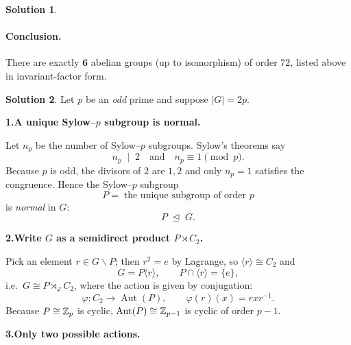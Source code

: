 \documentclass[12pt]{article}
\DeclareMathOperator{\Aut}{Aut}
\theoremstyle{definition} %
\newtheorem{solution}{Solution}
\theoremstyle{plain} %
\begin{document}
\begin{solution}
                \paragraph{Conclusion.}
                There are exactly \(\mathbf{6}\) abelian groups (up to isomorphism) of
                order \(72\), listed above in invariant-factor form.
                \end{solution}
                \begin{solution}
                  Let $p$ be an \emph{odd} prime and suppose $\lvert G\rvert = 2p$.
                  
                  \bigskip
                  \textbf{1.\;A unique Sylow–$p$ subgroup is normal.}
                  
                  Let $n_{p}$ be the number of Sylow–$p$ subgroups.  
                  Sylow’s theorems say
                  \[
                     n_{p}\;\mid\;2
                     \quad\text{and}\quad
                     n_{p}\equiv 1 \pmod{p}.
                  \]
                  Because $p$ is odd, the divisors of $2$ are $1,2$ and only
                  $n_{p}=1$ satisfies the congruence.  
                  Hence the Sylow–$p$ subgroup
                  \[
                     P=\;\text{the unique subgroup of order }p
                  \]
                  is \emph{normal} in $G$:
                  \[
                     P\;\trianglelefteq\;G.
                  \]
                  
                  \bigskip
                  \textbf{2.\;Write $G$ as a semidirect product $P\rtimes C_{2}$.}
                  
                  Pick an element $r\in G\smallsetminus P$; then $r^{2}=e$ by Lagrange,
                  so $\langle r\rangle\cong C_{2}$ and
                  \[
                     G = P\langle r\rangle,\qquad P\cap\langle r\rangle=\{e\},
                  \]
                  i.e.\ $G \cong P\rtimes_{\!\varphi} C_{2}$,
                  where the action is given by conjugation:
                  \[
                     \varphi:C_{2}\longrightarrow\Aut(P),
                     \qquad
                     \varphi(r)(x)=rxr^{-1}.
                  \]
                  Because $P\cong\Bbb Z_{p}$ is cyclic, 
                  $\Aut(P)\cong\Bbb Z_{p-1}$ is cyclic of order $p-1$.
                  
                  \bigskip
                  \textbf{3.\;Only two possible actions.}
                  

\end{solution}
\end{document}
